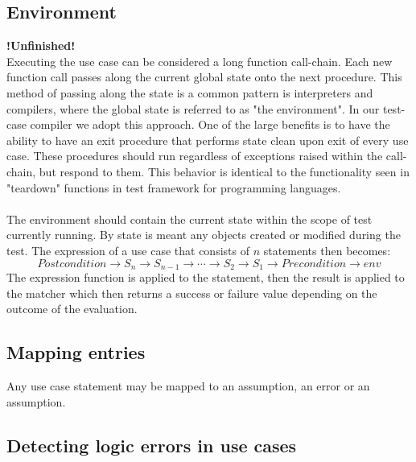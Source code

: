 \subsection{Environment}
\label{sec:test-environment}
\textbf{!Unfinished!}\\
Executing the use case can be considered a long function call-chain. Each new function call passes along the current global state onto the next procedure. This method of passing along the state is a common pattern is interpreters and compilers, where the global state is referred to as "the environment". In our test-case compiler we adopt this approach. One of the large benefits is to have the ability to have an exit procedure that performs state clean upon exit of every use case. These procedures should run regardless of exceptions raised within the call-chain, but respond to them. This behavior is identical to the functionality seen in "teardown" functions in test framework for programming languages.\\\\
The environment should contain the current state within the scope of test currently running. By state is meant any objects created or modified during the test.
The expression of a use case that consists of $n$ statements then becomes: 
\begin{equation}
Postcondition \rightarrow S_n \rightarrow S_{n-1} \rightarrow \dotsb \rightarrow S_2 \rightarrow S_1 \rightarrow Precondition \rightarrow env
\end{equation}
The expression function is applied to the statement, then the result is applied to the matcher which then returns a success or failure value depending on the outcome of the evaluation.


\subsection{Mapping entries}
Any use case statement may be mapped to an assumption, an error or an assumption.


\subsection{Detecting logic errors in use cases}

